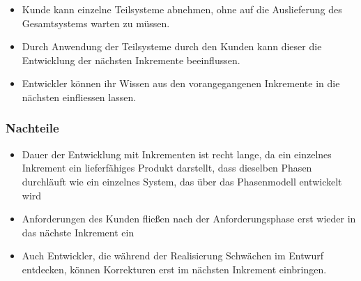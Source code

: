 \begin{itemize}
    \item Kunde kann einzelne Teilsysteme abnehmen, ohne auf die Auslieferung des Gesamtsystems warten zu müssen.
    \item Durch Anwendung der Teilsysteme durch den Kunden kann dieser die Entwicklung der nächsten Inkremente beeinflussen.
    \item Entwickler können ihr Wissen aus den vorangegangenen Inkremente in die nächsten einfliessen lassen.
\end{itemize}

\subsubsection*{Nachteile}

\begin{itemize}
    \item Dauer der Entwicklung mit Inkrementen ist recht lange, da ein einzelnes Inkrement ein lieferfähiges Produkt darstellt, dass dieselben Phasen durchläuft wie ein einzelnes System, das über das Phasenmodell entwickelt wird
    \item Anforderungen des Kunden fließen nach der Anforderungsphase erst wieder in das nächste Inkrement ein
    \item Auch Entwickler, die während der Realisierung Schwächen im Entwurf entdecken, können Korrekturen erst im nächsten Inkrement einbringen.
\end{itemize}